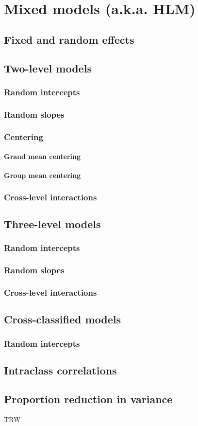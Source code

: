 \chapter{Mixed models (a.k.a. HLM)}
\section{Fixed and random effects}
\section{Two-level models}
\subsection{Random intercepts}
\subsection{Random slopes}
\subsection{Centering}
\subsubsection{Grand mean centering}
\subsubsection{Group mean centering}
\subsection{Cross-level interactions}

\section{Three-level models}
\subsection{Random intercepts}
\subsection{Random slopes}
\subsection{Cross-level interactions}

\section{Cross-classified models}
\subsection{Random intercepts}

\section{Intraclass correlations}
\section{Proportion reduction in variance}

TBW